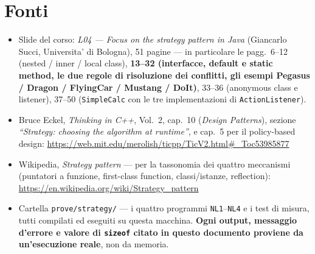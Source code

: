 \documentclass{report}
\newcommand{\code}[1]{\texttt{\small #1}}
\begin{document}
\chapter{Fonti}\label{ch:fonti}

\begin{itemize}
    \item Slide del corso: \emph{L04 --- Focus on the strategy pattern in
          Java} (Giancarlo Succi, Universita' di Bologna), 51 pagine ---
          in particolare le pagg.~6--12 (nested / inner / local class),
          \textbf{13--32 (interfacce, default e static method, le due
          regole di risoluzione dei conflitti, gli esempi Pegasus /
          Dragon / FlyingCar / Mustang / DoIt)}, 33--36 (anonymous class e
          listener), 37--50 (\code{SimpleCalc} con le tre implementazioni
          di \code{ActionListener}).
    \item Bruce Eckel, \emph{Thinking in C++}, Vol.~2, cap.~10
          (\emph{Design Patterns}), sezione \emph{``Strategy: choosing the
          algorithm at runtime''}, e cap.~5 per il policy-based design:
          \url{https://web.mit.edu/merolish/ticpp/TicV2.html\#_Toc53985877}
    \item Wikipedia, \emph{Strategy pattern} --- per la tassonomia dei
          quattro meccanismi (puntatori a funzione, first-class function,
          classi/istanze, reflection):
          \url{https://en.wikipedia.org/wiki/Strategy_pattern}
    \item Cartella \code{prove/strategy/} --- i quattro programmi
          \code{NL1}--\code{NL4} e i test di misura, tutti compilati ed
          eseguiti su questa macchina. \textbf{Ogni output, messaggio
          d'errore e valore di \code{sizeof} citato in questo documento
          proviene da un'esecuzione reale}, non da memoria.
\end{itemize}
\end{document}
